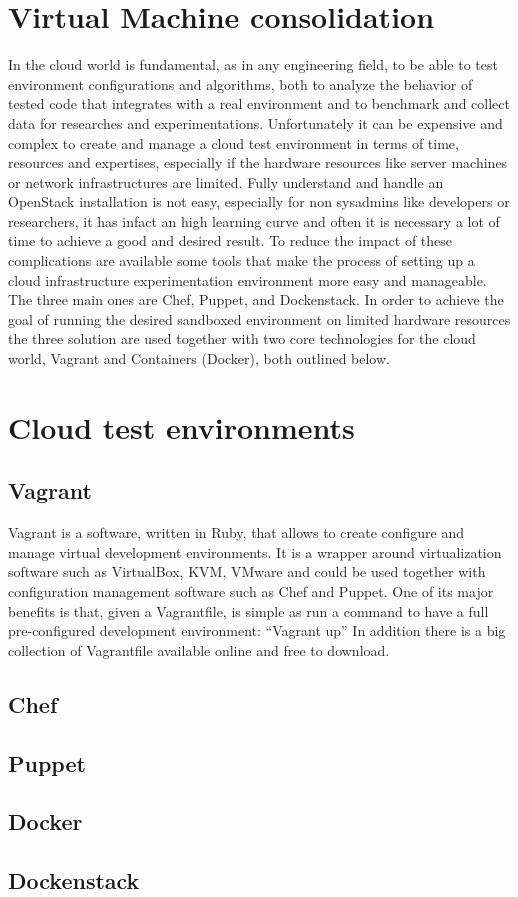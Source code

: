 \section{Virtual Machine consolidation}
\label{sec:sota_vm_cons}
In the cloud world is fundamental, as in any engineering field, to be able to test environment configurations and algorithms, both to analyze the behavior of tested code that integrates with a real environment and to benchmark and collect data for researches and experimentations. Unfortunately it can be expensive and complex to create and manage a cloud test environment in terms of time, resources and expertises, especially if the hardware resources like server machines or network infrastructures are limited. Fully understand and handle an OpenStack installation is not easy, especially for non sysadmins like developers or researchers, it has infact an high learning curve and often it is necessary a lot of time to achieve a good and desired result.
To reduce the impact of these complications are available some tools that make the process of setting up a cloud infrastructure experimentation environment more easy and manageable.
The three main ones are Chef, Puppet, and Dockenstack. In order to achieve the goal of running the desired sandboxed environment on limited hardware resources the three solution are used together with two core technologies for the cloud world, Vagrant and Containers (Docker), both outlined below.

\section{Cloud test environments}
\label{sec:sota_test_env}

\subsection{Vagrant}
\label{sub:sota_vagrant}
Vagrant is a software, written in Ruby, that allows to create configure and manage virtual development environments. It is a wrapper around virtualization software such as VirtualBox, KVM, VMware and could be used together with configuration management software such as Chef and Puppet.
One of its major benefits is that, given a Vagrantfile, is simple as run a command to have a full pre-configured development environment:
“Vagrant up”
In addition there is a big collection of Vagrantfile available online and free to download.


\subsection{Chef}
\label{sub:sota_chef}

\subsection{Puppet}
\label{sub:sota_puppet}

\subsection{Docker}
\label{sub:sota_docker}

\subsection{Dockenstack}
\label{sub:sota_dockenstack}

